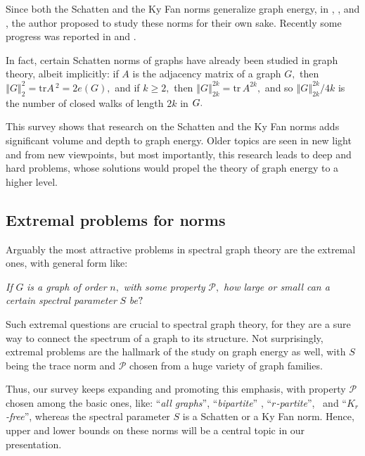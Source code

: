 \documentclass[12pt]{article}%
\begin{document}
Since both the Schatten and the Ky Fan norms generalize graph energy, in
\cite{Nik11c}, \cite{Nik12}, and \cite{Nik15c}, the author proposed to study
these norms for their own sake. Recently some progress was reported in
\cite{Nik15b} and \cite{NiYu13}.

In fact, certain Schatten norms of graphs have already been studied in graph
theory, albeit implicitly: if $A$ is the adjacency matrix of a graph $G,$ then
$\left\Vert G\right\Vert _{2}^{2}=\mathrm{tr}A\,^{2}=2e\left(  G\right)  ,$
and if $k\geq2,$ then $\left\Vert G\right\Vert _{2k}^{2k}=\mathrm{tr}%
\,A^{2k},$ and so $\left\Vert G\right\Vert _{2k}^{2k}/4k$ is the number of
closed walks of length $2k$ in $G.\medskip$

This survey shows that research on the Schatten and the Ky Fan norms adds
significant volume and depth to graph energy. Older topics are seen in new
light and from new viewpoints, but most importantly, this research leads to
deep and hard problems, whose solutions would propel the theory of graph
energy to a higher level.

\subsection{Extremal problems for norms}

Arguably the most attractive problems in spectral graph theory are the
extremal ones, with general form like:\medskip

\emph{If }$G$\emph{ is a graph of order }$n,$\emph{ with some property
}$\mathcal{P},$\emph{ how large or small can a certain spectral parameter }%
$S$\emph{ be}$?\medskip$

Such extremal questions are crucial to spectral graph theory, for they are a
sure way to connect the spectrum of a graph to its structure. Not
surprisingly, extremal problems are the hallmark of the study on graph energy
as well, with $S$ being the trace norm and $\mathcal{P}$ chosen from a huge
variety of graph families.

Thus, our survey keeps expanding and promoting this emphasis, with property
$\mathcal{P}$ chosen among the basic ones, like: \textquotedblleft\emph{all
graphs}\textquotedblright, \textquotedblleft\emph{bipartite}\textquotedblright%
, \textquotedblleft$r$\emph{-partite}\textquotedblright, \ and
\textquotedblleft$K_{r}$\emph{-free}\textquotedblright, whereas the spectral
parameter $S$ is a Schatten or a Ky Fan norm. Hence, upper and lower bounds on
these norms will be a central topic in our presentation.\medskip
\end{document}
